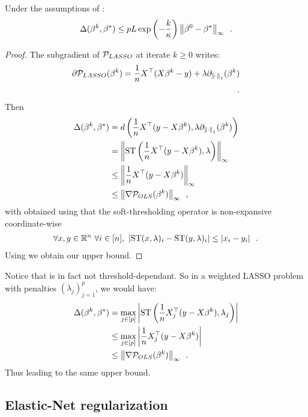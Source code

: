 \documentclass[../main.tex]{subfiles}
\begin{document}
\begin{proposition}\label{prop:lasso_kkt}
Under the assumptions of :
\begin{align}
    \Delta(\beta^k, \beta^*)
    \leq pL \exp\left(-\frac{k}{\kappa}\right) \left \lVert \beta^0 - \beta^* \right \rVert_\infty
    \enspace.
\end{align}
\end{proposition}
\begin{proof}
The subgradient of $\mathcal{P}_{LASSO}$ at iterate $k\geq 0$ writes:
\begin{align*}
\partial \mathcal{P}_{LASSO} (\beta^k)
= \frac{1}{n}X^\top (X\beta^k - y)
+ \lambda \partial_{\left \lVert \cdot \right \rVert_1}(\beta^k) \\
\enspace.
\end{align*}
Then
\begin{align}
\Delta(\beta^k, \beta^*)
& = d\left(\frac{1}{n}X^\top (y-X\beta^k),
 \lambda \partial_{\left \lVert \cdot \right \rVert_1}(\beta^k)  \right)\nonumber \\
& = \left \lVert \operatorname{ST}\left(\frac{1}{n}X^\top (y-X\beta^k), \lambda\right) \right \rVert_\infty \nonumber \\
& \leq \left \lVert \frac{1}{n}X^\top (y-X\beta^k) \right \rVert_\infty \label{ineq:st_non_expansive}\\
& \leq \left \lVert \nabla \mathcal{P}_{OLS}(\beta^k) \right \rVert_\infty
\enspace,\nonumber
\end{align}
with  obtained using that the soft-thresholding operator
is non-expansive coordinate-wise \citep[Lemma 3.2]{hale2008fixed} \ie
\begin{align*}
\forall x,y\in\mathbb{R}^n\ \forall i\in [n],\ \left \vert \operatorname{ST}(x, \lambda)_i - \operatorname{ST}(y, \lambda)_i \right \vert
\leq \left \vert x_i - y_i \right \vert\enspace.
\end{align*}
Using  we obtain our upper bound.
\end{proof}

Notice that  is in fact not threshold-dependant.
So in a weighted LASSO problem with penalties $(\lambda_j)_{j=1}^p$, we would have:
\begin{align*}
\Delta(\beta^k, \beta^*)
& = \max_{j\in[p]}\left \vert \operatorname{ST}\left(\frac{1}{n}X^\top_j (y-X\beta^k), \lambda_j\right) \right \vert \\
& \leq \max_{j\in[p]}\left \vert \frac{1}{n}X^\top_j (y-X\beta^k) \right \vert \\
& \leq \left \lVert \nabla \mathcal{P}_{OLS}(\beta^k) \right \rVert_\infty
\enspace.
\end{align*}
Thus leading to the same upper bound.

\subsection{Elastic-Net regularization}
\end{document}
